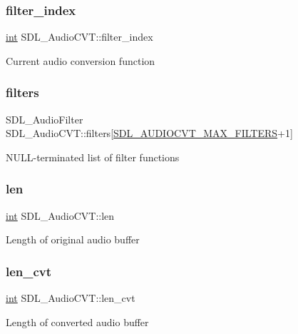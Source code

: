 \subsubsection{\texorpdfstring{filter\_index}{filter\_index}}
{\footnotesize\ttfamily \mbox{\hyperlink{warnings_8h_a74f207b5aa4ba51c3a2ad59b219a423b}{int}} S\+D\+L\+\_\+\+Audio\+C\+V\+T\+::filter\+\_\+index}

Current audio conversion function \mbox{\label{struct_s_d_l___audio_c_v_t_afeb8dc60716644de3b681653442de1db}} 
\subsubsection{\texorpdfstring{filters}{filters}}
{\footnotesize\ttfamily S\+D\+L\+\_\+\+Audio\+Filter S\+D\+L\+\_\+\+Audio\+C\+V\+T\+::filters\mbox{[}\mbox{\hyperlink{_s_d_l__audio_8h_a3d38380ac4a45a68a0e1c1a7a02bd290}{S\+D\+L\+\_\+\+A\+U\+D\+I\+O\+C\+V\+T\+\_\+\+M\+A\+X\+\_\+\+F\+I\+L\+T\+E\+RS}}+1\mbox{]}}

N\+U\+L\+L-\/terminated list of filter functions \mbox{\label{struct_s_d_l___audio_c_v_t_aeaeb8c5a63c3ab96471fbfdf412c78ff}} 
\subsubsection{\texorpdfstring{len}{len}}
{\footnotesize\ttfamily \mbox{\hyperlink{warnings_8h_a74f207b5aa4ba51c3a2ad59b219a423b}{int}} S\+D\+L\+\_\+\+Audio\+C\+V\+T\+::len}

Length of original audio buffer \mbox{\label{struct_s_d_l___audio_c_v_t_a5c60163f34d1947e5b166c23aba9879d}} 
\subsubsection{\texorpdfstring{len\_cvt}{len\_cvt}}
{\footnotesize\ttfamily \mbox{\hyperlink{warnings_8h_a74f207b5aa4ba51c3a2ad59b219a423b}{int}} S\+D\+L\+\_\+\+Audio\+C\+V\+T\+::len\+\_\+cvt}

Length of converted audio buffer \mbox{\label{struct_s_d_l___audio_c_v_t_ac9662d47cf2348b82b27b151150116b0}} 
